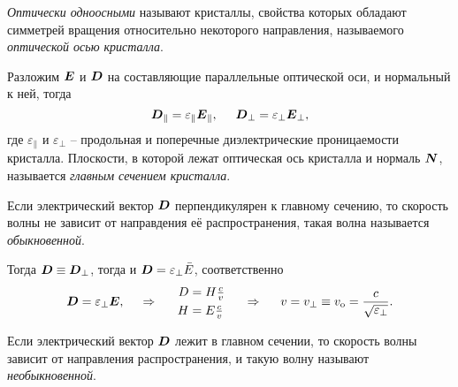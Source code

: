 

\begin{to_def}
    \textit{Оптически одноосными} называют кристаллы, свойства которых обладают симметрей вращения относительно некоторого направления, называемого \textit{оптической осью кристалла}.
\end{to_def}

Разложим $\mbox{\boldmath $E$}$ и $\mbox{\boldmath $D$}$ на составляющие параллельные оптической оси, и нормальный к ней, тогда
\begin{equation*}
    \mbox{\boldmath $D$}_\parallel = \varepsilon_\parallel \mbox{\boldmath $E$}_\parallel,
    \hspace{5 mm} 
    \mbox{\boldmath $D$}_\bot = \varepsilon_\bot \mbox{\boldmath $E$}_\bot,
\end{equation*}
где $\varepsilon_\parallel$ и $\varepsilon_\bot$ -- продольная и поперечные диэлектрические проницаемости кристалла. Плоскости, в которой лежат оптическая ось кристалла и нормаль $\mbox{\boldmath $N$}$, называется \textit{главным сечением кристалла}. 


\begin{to_def}
    Если электрический вектор $\mbox{\boldmath $D$}$ перпендикулярен к главному сечению, то скорость волны не зависит от направдения её распространения, такая волна называется \textit{обыкновенной}.
\end{to_def}

Тогда $\mbox{\boldmath $D$} \equiv \mbox{\boldmath $D$}_\bot$, тогда и $\mbox{\boldmath $D$} = \varepsilon_\bot \bar{E}$, соответственно 
\begin{equation*}
    \mbox{\boldmath $D$} = \varepsilon_\bot \mbox{\boldmath $E$},
    \hspace{0.5cm} \Rightarrow \hspace{0.5cm}
    \left.\begin{aligned}
        D &= H \textstyle \frac{c}{v} \\
        H &= E \textstyle \frac{c}{v}
    \end{aligned}\right.
    \hspace{5 mm} \Rightarrow \hspace{5 mm} 
    v = v_\bot \equiv v_{\textnormal{o}} = \frac{c}{\sqrt{\varepsilon_\bot}}.
\end{equation*}

\begin{to_def}
    Если электрический вектор $\mbox{\boldmath $D$}$ лежит в главном сечении, то скорость волны зависит от направления распространения, и такую волну называют \textit{необыкновенной}.
\end{to_def}

